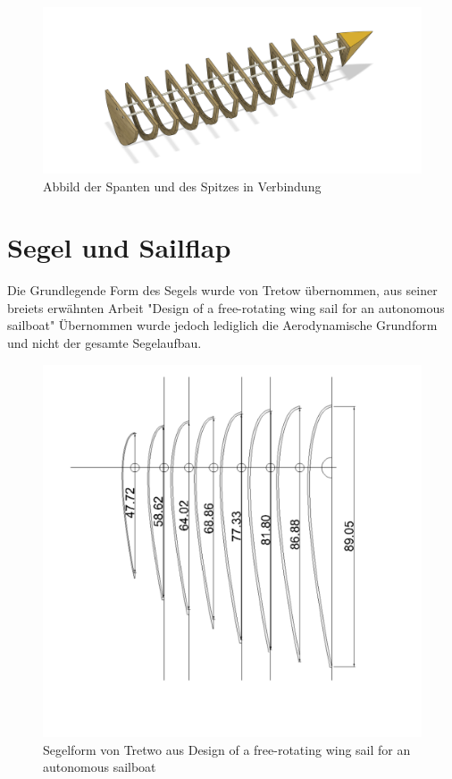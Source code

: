 \begin{figure}[H]
    \centering
    \includegraphics[width=1\linewidth]{assets/full_skellet.png}
    \caption{Abbild der Spanten und des Spitzes in Verbindung}
    
\end{figure}




\section{Segel und Sailflap}
Die Grundlegende Form des Segels wurde von Tretow  übernommen, aus seiner breiets erwähnten Arbeit "Design of a free-rotating wing sail for an autonomous sailboat" \cite{Tretow2017DesignOA}
Übernommen wurde jedoch lediglich die Aerodynamische Grundform und nicht der gesamte Segelaufbau.

\begin{figure}[H]
    \centering
    \includegraphics[angle=270,width=0.5\linewidth]{assets/sail_form_foam.png}
    \caption{Segelform von Tretwo aus Design of a free-rotating wing sail for an autonomous sailboat}
    \label{fig:enter-label}
\end{figure}

